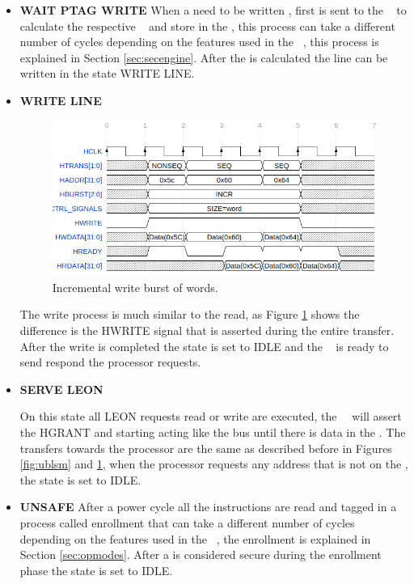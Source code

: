 \begin{itemize}
 \item{\textbf{WAIT PTAG WRITE}}
 When a \sline need to be written , first is sent to the \seceng~ to calculate the respective \ptag~ and store in the \ptagmem, this process can take a different number of cycles depending on the features used in the \seceng~, this process is explained  in Section \ref{sec:secengine}. After the \ptag is calculated the line can be written in the state WRITE LINE.
 
 
 \item{\textbf{WRITE LINE}}
   \begin{figure}[H]
    \centering
    \includegraphics[width=\textwidth]{figures/others/ahbwrite.png}
    \caption{Incremental write burst of words.}
    \label{fig:ahbwrite}
  \end{figure}
The write process is much similar to the read, as Figure \ref{fig:ahbwrite} shows the difference is the HWRITE signal that is asserted during the entire transfer. After the write is completed the state is set to IDLE and the \handler~ is ready to send respond the processor requests.

 \item{\textbf{SERVE LEON}}

 On this state  all LEON requests  read or write are executed, the \handler~~will assert the HGRANT and starting acting like the bus until there is data in the \sbuf. The transfers towards the processor are the same as described before in Figures \ref{fig:ublsm} and \ref{fig:ahbwrite}, when the processor requests  any address that is not on the \sbuf, the state is set to IDLE.
 
\item{\textbf{UNSAFE}}
After a power cycle all the instructions are read and tagged in a process called enrollment that can take a different number of cycles depending on the features used in the \seceng~, the enrollment is explained in Section \ref{sec:opmodes}. After a \sline is considered secure during the enrollment phase the state is set to IDLE.
 
\end{itemize}

